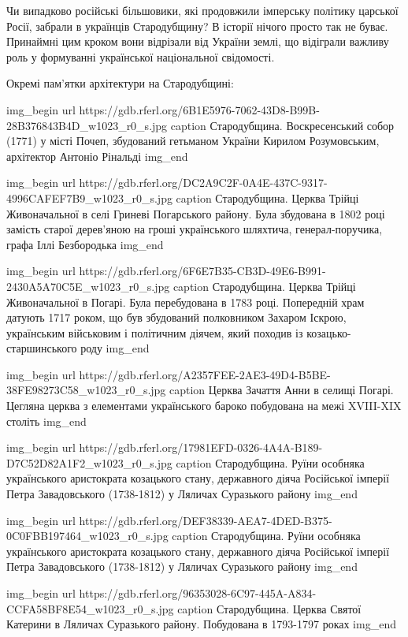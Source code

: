 Чи випадково російські більшовики, які продовжили імперську політику царської
Росії, забрали в українців Стародубщину? В історії нічого просто так не буває.
Принаймні цим кроком вони відрізали від України землі, що відіграли важливу
роль у формуванні української національної свідомості.

Окремі пам'ятки архітектури на Стародубщині:

\ifcmt
img_begin 
  url https://gdb.rferl.org/6B1E5976-7062-43D8-B99B-28B376843B4D_w1023_r0_s.jpg
  caption Стародубщина. Воскресенський собор (1771) у місті Почеп, збудований
  гетьманом України Кирилом Розумовським, архітектор Антоніо Рінальді
img_end
\fi

\ifcmt
img_begin 
url https://gdb.rferl.org/DC2A9C2F-0A4E-437C-9317-4996CAFEF7B9_w1023_r0_s.jpg
caption Стародубщина. Церква Трійці Живоначальної в селі Гриневі Погарського
району. Була збудована в 1802 році замість старої дерев’яною на гроші
українського шляхтича, генерал-поручика, графа Іллі Безбородька
img_end
\fi

\ifcmt
img_begin 
url https://gdb.rferl.org/6F6E7B35-CB3D-49E6-B991-2430A5A70C5E_w1023_r0_s.jpg
caption Стародубщина. Церква Трійці Живоначальної в Погарі. Була перебудована в
1783 році. Попередній храм датують 1717 роком, що був збудований полковником
Захаром Іскрою, українським військовим і політичним діячем, який походив із
козацько-старшинського роду
img_end
\fi

\ifcmt
img_begin 
url https://gdb.rferl.org/A2357FEE-2AE3-49D4-B5BE-38FE98273C58_w1023_r0_s.jpg
caption Церква Зачаття Анни в селищі Погарі. Цегляна церква з елементами українського бароко побудована на межі XVIII-XIX століть
img_end
\fi

\ifcmt
img_begin 
url https://gdb.rferl.org/17981EFD-0326-4A4A-B189-D7C52D82A1F2_w1023_r0_s.jpg
caption Стародубщина. Руїни особняка українського аристократа козацького стану, державного діяча Російської імперії Петра Завадовського (1738-1812) у Ляличах Суразького району
img_end
\fi

\ifcmt
img_begin 
url https://gdb.rferl.org/DEF38339-AEA7-4DED-B375-0C0FBB197464_w1023_r0_s.jpg
caption Стародубщина. Руїни особняка українського аристократа козацького стану, державного діяча Російської імперії Петра Завадовського (1738-1812) у Ляличах Суразького району
img_end
\fi

\ifcmt
img_begin 
url https://gdb.rferl.org/96353028-6C97-445A-A834-CCFA58BF8E54_w1023_r0_s.jpg
caption Стародубщина. Церква Святої Катерини в Ляличах Суразького району. Побудована в 1793-1797 роках
img_end
\fi

